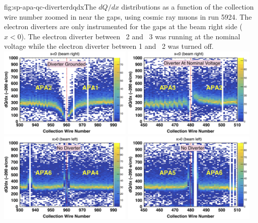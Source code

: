 \begin{dunefigure}
{fig:sp-apa-qc-diverterdqdx}{The $dQ/dx$ distributions as a function of the collection wire number zoomed in near the gaps, using cosmic ray muons in  run 5924. The electron diverters are only instrumented for the gaps at the beam right side ($x<0$). The electron diverter between ~2 and ~3 was running at the nominal voltage while the electron diverter between 1 and ~2 was turned off. }
\includegraphics[width=0.48\textwidth]{graphics/sp-apa-dQdxAPA12.png}
\includegraphics[width=0.48\textwidth]{graphics/sp-apa-dQdxAPA32.png}
\includegraphics[width=0.48\textwidth]{graphics/sp-apa-dQdxAPA46.png}
\includegraphics[width=0.48\textwidth]{graphics/sp-apa-dQdxAPA56.png}
\end{dunefigure}
    



